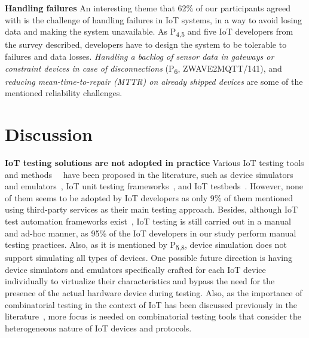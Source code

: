 \textbf{Handling failures} An interesting theme that 62\% of our participants agreed with is the challenge of handling failures in IoT systems, in a way to avoid losing data and making the system unavailable. As P\textsubscript{4,5} and five IoT developers from the survey described, developers have to design the system to be tolerable to failures and data losses. \emph{Handling a backlog of sensor data in gateways or constraint devices in case of disconnections} (P\textsubscript{6}, ZWAVE2MQTT/141), and \emph{reducing mean-time-to-repair (MTTR) on already shipped devices} are some of the mentioned reliability challenges. 

\section{Discussion}
\textbf{IoT testing solutions are not adopted in practice}
Various IoT testing tools and methods~\cite{testingtools2018}~\cite{pontes2018test} have been proposed in the literature, such as device simulators~\cite{iotify} and emulators~\cite{looga2012mammoth}, IoT unit testing frameworks~\cite{ArduinoUnit,platformio}, and IoT testbeds~\cite{iottestbed}. However, none of them seems to be adopted by IoT developers as only 9\% of them mentioned using third-party services as their main testing approach. Besides, although IoT test automation frameworks exist~\cite{iotify}, IoT testing is still carried out in a manual and ad-hoc manner, as 95\% of the IoT developers in our study perform manual testing practices. Also, as it is mentioned by P\textsubscript{5,8}, device simulation does not support simulating all types of devices. One possible future direction is having device simulators and emulators specifically crafted for each IoT device individually to virtualize their characteristics and bypass the need for the presence of the actual hardware device during testing. Also, as the importance of combinatorial testing in the context of IoT has been discussed previously in the literature~\cite{voas2018testing}, more focus is needed on combinatorial testing tools that consider the heterogeneous nature of IoT devices and protocols.

